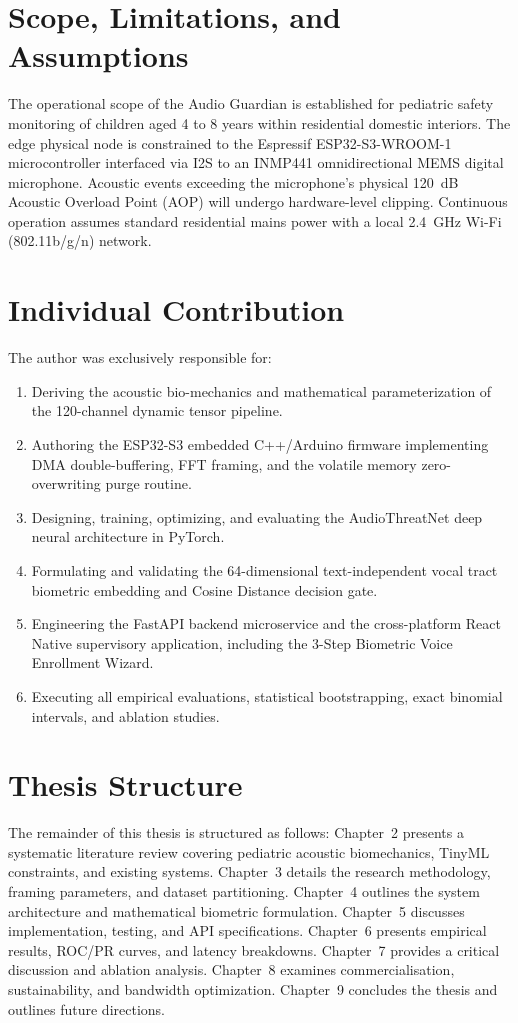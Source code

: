 \documentclass[12pt, a4paper]{report}
\begin{document}
\section{Scope, Limitations, and Assumptions}
The operational scope of the Audio Guardian is established for pediatric safety monitoring of children aged 4 to 8 years within residential domestic interiors. The edge physical node is constrained to the Espressif ESP32-S3-WROOM-1 microcontroller interfaced via I2S to an INMP441 omnidirectional MEMS digital microphone. Acoustic events exceeding the microphone's physical 120~dB Acoustic Overload Point (AOP) will undergo hardware-level clipping. Continuous operation assumes standard residential mains power with a local 2.4~GHz Wi-Fi (802.11b/g/n) network.

\section{Individual Contribution}
The author was exclusively responsible for:
\begin{enumerate}
    \item Deriving the acoustic bio-mechanics and mathematical parameterization of the 120-channel dynamic tensor pipeline.
    \item Authoring the ESP32-S3 embedded C++/Arduino firmware implementing DMA double-buffering, FFT framing, and the volatile memory zero-overwriting purge routine.
    \item Designing, training, optimizing, and evaluating the AudioThreatNet deep neural architecture in PyTorch.
    \item Formulating and validating the 64-dimensional text-independent vocal tract biometric embedding and Cosine Distance decision gate.
    \item Engineering the FastAPI backend microservice and the cross-platform React Native supervisory application, including the 3-Step Biometric Voice Enrollment Wizard.
    \item Executing all empirical evaluations, statistical bootstrapping, exact binomial intervals, and ablation studies.
\end{enumerate}

\section{Thesis Structure}
The remainder of this thesis is structured as follows: Chapter~2 presents a systematic literature review covering pediatric acoustic biomechanics, TinyML constraints, and existing systems. Chapter~3 details the research methodology, framing parameters, and dataset partitioning. Chapter~4 outlines the system architecture and mathematical biometric formulation. Chapter~5 discusses implementation, testing, and API specifications. Chapter~6 presents empirical results, ROC/PR curves, and latency breakdowns. Chapter~7 provides a critical discussion and ablation analysis. Chapter~8 examines commercialisation, sustainability, and bandwidth optimization. Chapter~9 concludes the thesis and outlines future directions.
\end{document}
